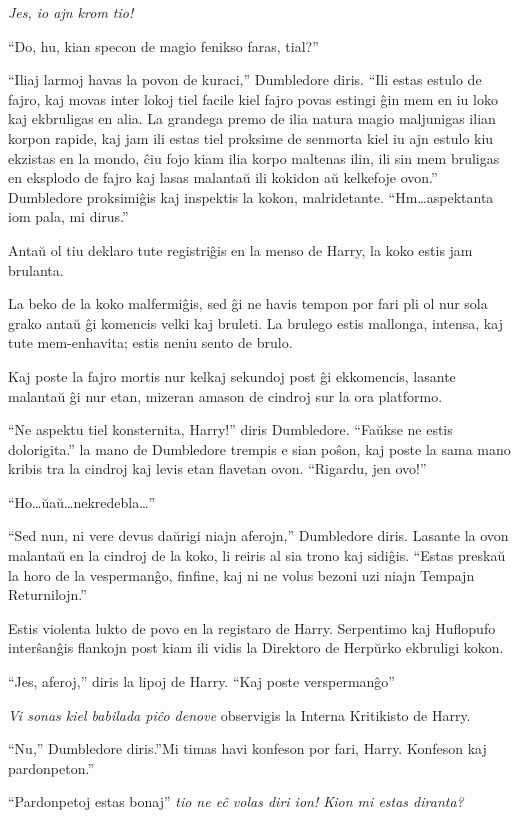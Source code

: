 \emph{Jes, io ajn krom tio!}

``Do, hu, kian specon de magio fenikso faras, tial?''

``Iliaj larmoj havas la povon de kuraci,'' Dumbledore diris. ``Ili
estas estulo de fajro, kaj movas inter lokoj tiel facile kiel fajro
povas estingi ĝin mem en iu loko kaj ekbruligas en alia. La grandega
premo de ilia natura magio maljunigas ilian korpon rapide, kaj jam ili
estas tiel proksime de senmorta kiel iu ajn estulo kiu ekzistas en la
mondo, ĉiu fojo kiam ilia korpo maltenas ilin, ili sin mem bruligas en
eksplodo de fajro kaj lasas malantaŭ ili kokidon aŭ kelkefoje ovon.''
Dumbledore proksimiĝis kaj inspektis la kokon,
malridetante. ``Hm\ldots aspektanta iom pala, mi dirus.''

Antaŭ ol tiu deklaro tute registriĝis en la menso de Harry, la koko
estis jam brulanta.

La beko de la koko malfermiĝis, sed ĝi ne havis tempon por fari pli ol
nur sola grako antaŭ ĝi komencis velki kaj bruleti. La brulego estis
mallonga, intensa, kaj tute mem-enhavita; estis neniu sento de brulo.

Kaj poste la fajro mortis nur kelkaj sekundoj post ĝi ekkomencis,
lasante malantaŭ ĝi nur etan, mizeran amason de cindroj sur la ora
platformo.

``Ne aspektu tiel konsternita, Harry!'' diris Dumbledore. ``Faŭkse ne
estis dolorigita.'' la mano de Dumbledore trempis e sian poŝon, kaj
poste la sama mano kribis tra la cindroj kaj levis etan flavetan
ovon. ``Rigardu, jen ovo!''

``Ho\ldots ŭaŭ\ldots nekredebla\ldots''

``Sed nun, ni vere devus daŭrigi niajn aferojn,'' Dumbledore
diris. Lasante la ovon malantaŭ en la cindroj de la koko, li reiris al
sia trono kaj sidiĝis. ``Estas preskaŭ la horo de la vespermanĝo,
finfine, kaj ni ne volus bezoni uzi niajn Tempajn Returnilojn.''

Estis violenta lukto de povo en la registaro de Harry. Serpentimo kaj
Huflopufo interŝanĝis flankojn post kiam ili vidis la Direktoro
de Herpŭrko ekbruligi kokon.

``Jes, aferoj,'' diris la lipoj de Harry. ``Kaj poste verspermanĝo''

\emph{Vi sonas kiel babilada piĉo denove} observigis la Interna
Kritikisto de Harry.

``Nu,'' Dumbledore diris.''Mi timas havi konfeson por fari,
Harry. Konfeson kaj pardonpeton.''

``Pardonpetoj estas bonaj'' \emph{tio ne eĉ volas diri ion! Kion mi estas diranta?}

